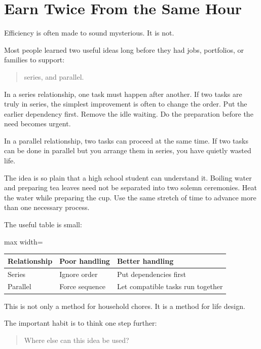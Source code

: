\chapter{Earn Twice From the Same Hour}

Efficiency is often made to sound mysterious. It is not.

Most people learned two useful ideas long before they had jobs, portfolios, or families to support:

\begin{quote}
series, and parallel.
\end{quote}

In a series relationship, one task must happen after another. If two tasks are truly in series, the simplest improvement is often to change the order. Put the earlier dependency first. Remove the idle waiting. Do the preparation before the need becomes urgent.

In a parallel relationship, two tasks can proceed at the same time. If two tasks can be done in parallel but you arrange them in series, you have quietly wasted life.

The idea is so plain that a high school student can understand it. Boiling water and preparing tea leaves need not be separated into two solemn ceremonies. Heat the water while preparing the cup. Use the same stretch of time to advance more than one necessary process.

The useful table is small:

\begin{center}
\begin{adjustbox}{max width=\linewidth}
\begin{tabular}{lll}
\hline
Relationship & Poor handling & Better handling \\
\hline
Series & Ignore order & Put dependencies first \\
Parallel & Force sequence & Let compatible tasks run together \\
\hline
\end{tabular}
\end{adjustbox}
\end{center}

This is not only a method for household chores. It is a method for life design.

The important habit is to think one step further:

\begin{quote}
Where else can this idea be used?
\end{quote}

